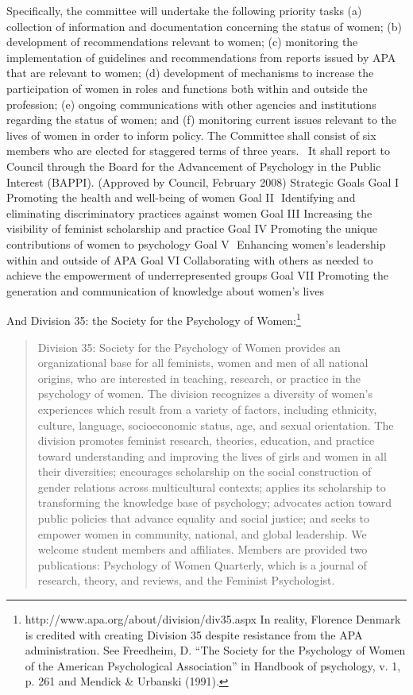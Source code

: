 Specifically, the committee will undertake the following priority tasks
(a) collection of information and documentation concerning the status of women;
(b) development of recommendations relevant to women;
(c) monitoring the implementation of guidelines and recommendations from reports issued by APA that are relevant to women;
(d) development of mechanisms to increase the participation of women in roles and functions both within and outside the profession;
(e) ongoing communications with other agencies and institutions regarding the status of women; and
(f) monitoring current issues relevant to the lives of women in order to inform policy.
The Committee shall consist of six members who are elected for staggered terms of three years.  It shall report to Council through the Board for the Advancement of Psychology in the Public Interest (BAPPI). (Approved by Council, February 2008)
Strategic Goals
Goal I  Promoting the health and well-being of women
Goal II  Identifying and eliminating discriminatory practices against women
Goal III Increasing the visibility of feminist scholarship and practice
Goal IV Promoting the unique contributions of women to psychology
Goal V  Enhancing women’s leadership within and outside of APA
Goal VI Collaborating with others as needed to achieve the empowerment of underrepresented groups
Goal VII Promoting the generation and communication of knowledge about women’s lives

And Division 35: the Society for the Psychology of Women:\footnote{http:\slash \slash www.apa.org\slash about\slash division\slash div35.aspx In reality, Florence Denmark is credited with creating Division 35 despite resistance from the APA administration. See Freedheim, D. “The Society for the Psychology of Women of the American Psychological Association” in Handbook of psychology, v. 1, p. 261 and Mendick \& Urbanski (1991).}

\begin{quote}

Division 35: Society for the Psychology of Women provides an organizational base for all feminists, women and men of all national origins, who are interested in teaching, research, or practice in the psychology of women. The division recognizes a diversity of women's experiences which result from a variety of factors, including ethnicity, culture, language, socioeconomic status, age, and sexual orientation. The division promotes feminist research, theories, education, and practice toward understanding and improving the lives of girls and women in all their diversities; encourages scholarship on the social construction of gender relations across multicultural contexts; applies its scholarship to transforming the knowledge base of psychology; advocates action toward public policies that advance equality and social justice; and seeks to empower women in community, national, and global leadership. We welcome student members and affiliates. Members are provided two publications: Psychology of Women Quarterly, which is a journal of research, theory, and reviews, and the Feminist Psychologist.
\end{quote}

